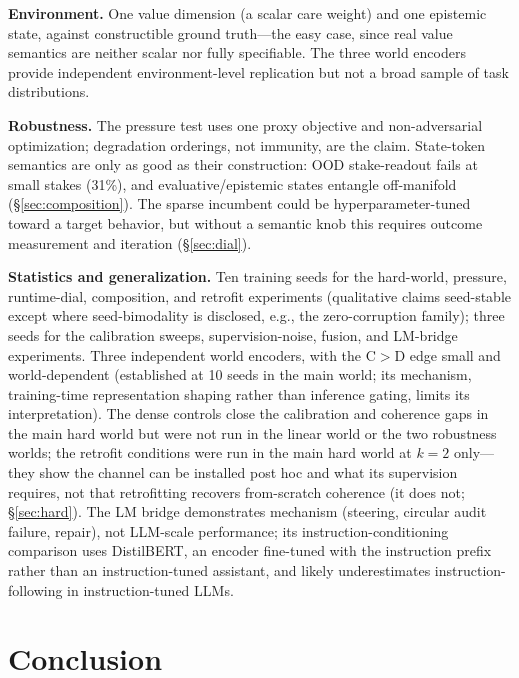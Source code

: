 \documentclass[11pt]{article}
\begin{document}
\textbf{Environment.} One value dimension (a scalar care weight) and one epistemic state, against constructible ground truth---the easy case, since real value semantics are neither scalar nor fully specifiable. The three world encoders provide independent environment-level replication but not a broad sample of task distributions.

\textbf{Robustness.} The pressure test uses one proxy objective and non-adversarial optimization; degradation orderings, not immunity, are the claim. State-token semantics are only as good as their construction: OOD stake-readout fails at small stakes (31\%), and evaluative/epistemic states entangle off-manifold (\S\ref{sec:composition}). The sparse incumbent could be hyperparameter-tuned toward a target behavior, but without a semantic knob this requires outcome measurement and iteration (\S\ref{sec:dial}).

\textbf{Statistics and generalization.} Ten training seeds for the hard-world, pressure, runtime-dial, composition, and retrofit experiments (qualitative claims seed-stable except where seed-bimodality is disclosed, e.g., the zero-corruption family); three seeds for the calibration sweeps, supervision-noise, fusion, and LM-bridge experiments. Three independent world encoders, with the C$>$D edge small and world-dependent (established at 10 seeds in the main world; its mechanism, training-time representation shaping rather than inference gating, limits its interpretation). The dense controls close the calibration and coherence gaps in the main hard world but were not run in the linear world or the two robustness worlds; the retrofit conditions were run in the main hard world at $k{=}2$ only---they show the channel can be installed post hoc and what its supervision requires, not that retrofitting recovers from-scratch coherence (it does not; \S\ref{sec:hard}). The LM bridge demonstrates mechanism (steering, circular audit failure, repair), not LLM-scale performance; its instruction-conditioning comparison uses DistilBERT, an encoder fine-tuned with the instruction prefix rather than an instruction-tuned assistant, and likely underestimates instruction-following in instruction-tuned LLMs.

\section{Conclusion}
\end{document}
